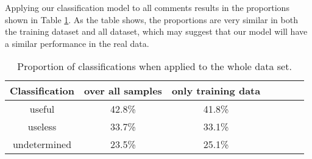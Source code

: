 Applying our classification model to all comments results in the proportions shown in Table \ref{tb:percent}.
As the table shows, the proportions are very similar in both the training dataset and all dataset,
which may suggest that our model will have a similar performance in the real data.

\begin{table}[!t]
\caption{Proportion of classifications when applied to the whole data set.}
\small
\centering
\def\arraystretch{1.2}
\begin{tabular}{ccccccc}
\hline
Classification & over all samples & only training data \\ \hline
useful & 42.8\% & 41.8\% \\
useless & 33.7\% & 33.1\% \\
undetermined & 23.5\% & 25.1\% \\ \hline
\end{tabular}
\label{tb:percent}
\end{table}





